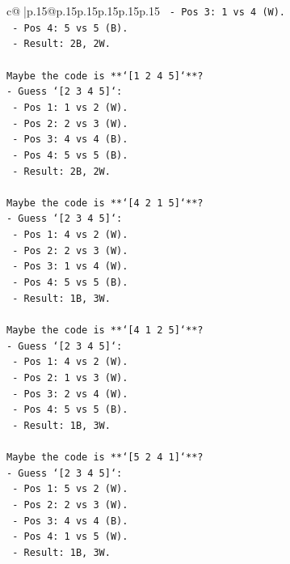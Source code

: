 \documentclass{article}
\begin{document}
{\begin{supertabular}{c@{$\;$}|p{.15\linewidth}@{}p{.15\linewidth}p{.15\linewidth}p{.15\linewidth}p{.15\linewidth}p{.15\linewidth}}
{{{\texttt{        {-} Pos 3: 1 vs 4 (W).} \\
\texttt{        {-} Pos 4: 5 vs 5 (B).} \\
\texttt{        {-} Result: 2B, 2W.} \\
\\ 
\texttt{Maybe the code is **`{[}1 2 4 5{]}`**?} \\
\texttt{{-} Guess `{[}2 3 4 5{]}`:} \\
\texttt{    {-} Pos 1: 1 vs 2 (W).} \\
\texttt{    {-} Pos 2: 2 vs 3 (W).} \\
\texttt{    {-} Pos 3: 4 vs 4 (B).} \\
\texttt{    {-} Pos 4: 5 vs 5 (B).} \\
\texttt{    {-} Result: 2B, 2W.} \\
\\ 
\texttt{Maybe the code is **`{[}4 2 1 5{]}`**?} \\
\texttt{{-} Guess `{[}2 3 4 5{]}`:} \\
\texttt{    {-} Pos 1: 4 vs 2 (W).} \\
\texttt{    {-} Pos 2: 2 vs 3 (W).} \\
\texttt{    {-} Pos 3: 1 vs 4 (W).} \\
\texttt{    {-} Pos 4: 5 vs 5 (B).} \\
\texttt{    {-} Result: 1B, 3W.} \\
\\ 
\texttt{Maybe the code is **`{[}4 1 2 5{]}`**?} \\
\texttt{{-} Guess `{[}2 3 4 5{]}`:} \\
\texttt{    {-} Pos 1: 4 vs 2 (W).} \\
\texttt{    {-} Pos 2: 1 vs 3 (W).} \\
\texttt{    {-} Pos 3: 2 vs 4 (W).} \\
\texttt{    {-} Pos 4: 5 vs 5 (B).} \\
\texttt{    {-} Result: 1B, 3W.} \\
\\ 
\texttt{Maybe the code is **`{[}5 2 4 1{]}`**?} \\
\texttt{{-} Guess `{[}2 3 4 5{]}`:} \\
\texttt{    {-} Pos 1: 5 vs 2 (W).} \\
\texttt{    {-} Pos 2: 2 vs 3 (W).} \\
\texttt{    {-} Pos 3: 4 vs 4 (B).} \\
\texttt{    {-} Pos 4: 1 vs 5 (W).} \\
\texttt{    {-} Result: 1B, 3W.} \\
}}}
\end{supertabular}}
\end{document}
